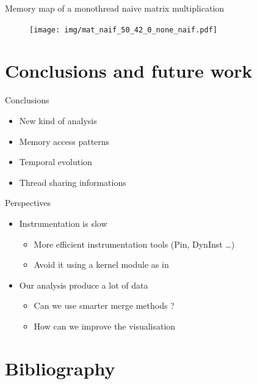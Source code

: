 \documentclass[xcolor={usenames,dvipsnames}]{beamer}
\newcommand{\sectiontitle}{}
\newcommand{\newsection}[1]{\renewcommand{\sectiontitle}{#1}\section{#1}}
\newcommand{\newHsection}[1]{\renewcommand{\sectiontitle}{#1}\section*{#1}}
\begin{document}
\begin{frame}{Memory map of a monothread naive matrix multiplication}
    \begin{figure}
        \centering
        \texttt{[image: img/mat\_naif\_50\_42\_0\_none\_naif.pdf]}
    \end{figure}
\end{frame}

\newsection{Conclusions and future work}

\begin{frame}{Conclusions}
    \begin{itemize}
        \item New kind of analysis
        \item Memory access patterns
        \item Temporal evolution
        \item Thread sharing informations
    \end{itemize}
\end{frame}

\setcounter{finalframe}{\value{framenumber}}
\begin{frame}{Perspectives}
    \begin{itemize}
        \item Instrumentation is slow
            \begin{itemize}
                \item More efficient instrumentation tools (Pin, DynInst
                    \dots)
                \item Avoid it using a kernel module as in \cite{Cruz12Using}
            \end{itemize}
        \item Our analysis produce a lot of data
            \begin{itemize}
                \item Can we use smarter merge methods ?
                \item How can we improve the visualisation
            \end{itemize}
    \end{itemize}
\end{frame}


\newHsection{Bibliography}
%


\end{document}
